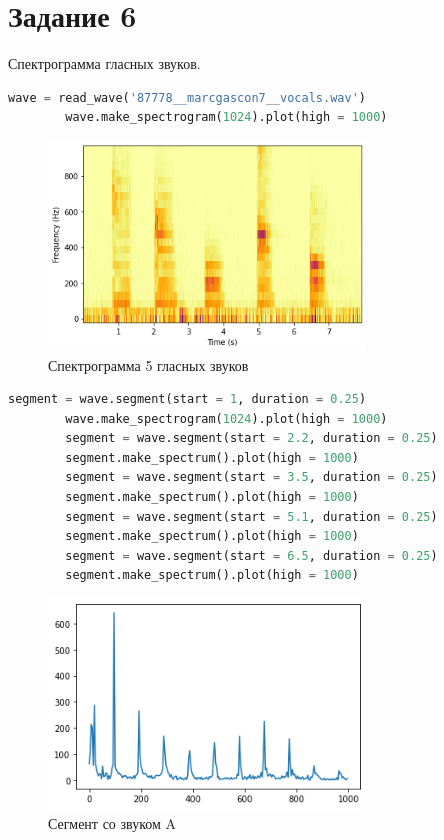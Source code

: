 \documentclass[a4paper, 12pt]{report}
\begin{document}
	\section{Задание 6}
	Спектрограмма гласных звуков.
	 \begin{lstlisting}[language=Python,caption=Получение сигнала]
		wave = read_wave('87778__marcgascon7__vocals.wav')
		wave.make_spectrogram(1024).plot(high = 1000)
	\end{lstlisting}
	\begin{figure}[H]
		\centering
		\includegraphics[width=0.75\textwidth]{test2.png}
		\caption{Спектрограмма 5 гласных звуков}
		\label{fig:test2}
	\end{figure}
	\begin{lstlisting}[language=Python,caption=Сегменты для каждого звука]
		segment = wave.segment(start = 1, duration = 0.25)
		wave.make_spectrogram(1024).plot(high = 1000)
		segment = wave.segment(start = 2.2, duration = 0.25)
		segment.make_spectrum().plot(high = 1000)
		segment = wave.segment(start = 3.5, duration = 0.25)
		segment.make_spectrum().plot(high = 1000)
		segment = wave.segment(start = 5.1, duration = 0.25)
		segment.make_spectrum().plot(high = 1000)
		segment = wave.segment(start = 6.5, duration = 0.25)
		segment.make_spectrum().plot(high = 1000)
	\end{lstlisting}
	\begin{figure}[H]
		\centering
		\includegraphics[width=0.75\textwidth]{word1.png}
		\caption{Сегмент со звуком A}
		\label{fig:word1}
	\end{figure}
\end{document}
